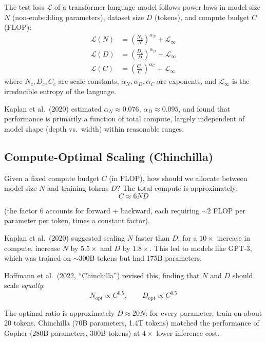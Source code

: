 \documentclass[main.tex]{subfiles}
\begin{document}
\begin{definition}
The test loss $\mathcal{L}$ of a transformer language model follows power laws in model size $N$ (non-embedding parameters), dataset size $D$ (tokens), and compute budget $C$ (FLOP):
\begin{align}
\mathcal{L}(N) &= \left(\frac{N_c}{N}\right)^{\alpha_N} + \mathcal{L}_\infty \\[4pt]
\mathcal{L}(D) &= \left(\frac{D_c}{D}\right)^{\alpha_D} + \mathcal{L}_\infty \\[4pt]
\mathcal{L}(C) &= \left(\frac{C_c}{C}\right)^{\alpha_C} + \mathcal{L}_\infty
\end{align}
where $N_c, D_c, C_c$ are scale constants, $\alpha_N, \alpha_D, \alpha_C$ are exponents, and $\mathcal{L}_\infty$ is the irreducible entropy of the language.
\end{definition}

Kaplan et al.\ (2020) estimated $\alpha_N \approx 0.076$, $\alpha_D \approx 0.095$, and found that performance is primarily a function of total compute, largely independent of model shape (depth vs.\ width) within reasonable ranges.

\subsection{Compute-Optimal Scaling (Chinchilla)}

Given a fixed compute budget $C$ (in FLOP), how should we allocate between model size $N$ and training tokens $D$? The total compute is approximately:
$$C \approx 6ND$$

(the factor 6 accounts for forward + backward, each requiring $\sim 2$ FLOP per parameter per token, times a constant factor).

Kaplan et al.\ (2020) suggested scaling $N$ faster than $D$: for a $10\times$ increase in compute, increase $N$ by $5.5\times$ and $D$ by $1.8\times$. This led to models like GPT-3, which was trained on $\sim 300$B tokens but had 175B parameters.

Hoffmann et al.\ (2022, ``Chinchilla'') revised this, finding that $N$ and $D$ should scale \textit{equally}:
$$N_{\text{opt}} \propto C^{0.5}, \qquad D_{\text{opt}} \propto C^{0.5}$$

The optimal ratio is approximately $D \approx 20N$: for every parameter, train on about 20 tokens. Chinchilla (70B parameters, 1.4T tokens) matched the performance of Gopher (280B parameters, 300B tokens) at $4\times$ lower inference cost.
\end{document}
